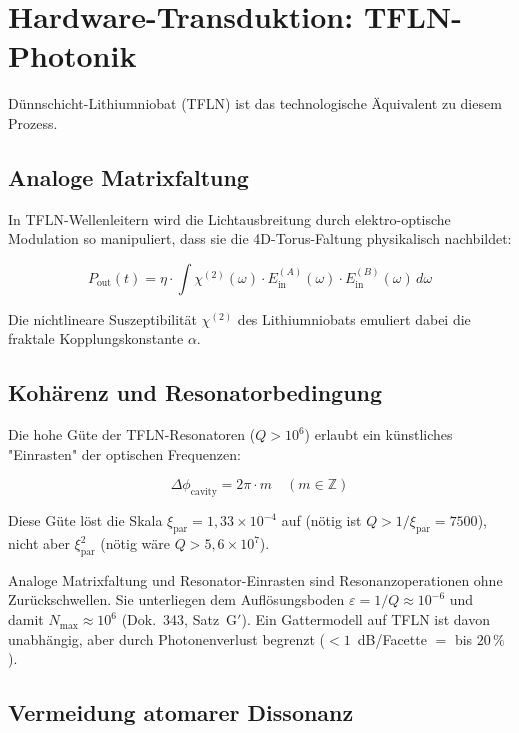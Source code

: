 	\section{Hardware-Transduktion: TFLN-Photonik}
	
	Dünnschicht-Lithiumniobat (TFLN) ist das technologische Äquivalent zu diesem Prozess.
	
	\subsection{Analoge Matrixfaltung}
	
	In TFLN-Wellenleitern wird die Lichtausbreitung durch elektro-optische Modulation so manipuliert, dass sie die 4D-Torus-Faltung physikalisch nachbildet:
	
	\begin{equation}
		P_{\text{out}}(t) = \eta \cdot \int \chi^{(2)}(\omega) \cdot E_{\text{in}}^{(A)}(\omega) \cdot E_{\text{in}}^{(B)}(\omega) \, d\omega
	\end{equation}
	
	Die nichtlineare Suszeptibilität $\chi^{(2)}$ des Lithiumniobats emuliert dabei die fraktale Kopplungskonstante $\alpha$.
	
	\subsection{Kohärenz und Resonatorbedingung}
	
	Die hohe Güte der TFLN-Resonatoren ($Q > 10^6$) erlaubt ein künstliches "Einrasten" der optischen Frequenzen:
	
	\begin{equation}
		\Delta \phi_{\text{cavity}} = 2\pi \cdot m \quad (m \in \mathbb{Z})
	\end{equation}
	
	Diese Güte löst die Skala $\xi_{\text{par}} = 1{,}33\times10^{-4}$ auf (nötig ist $Q > 1/\xi_{\text{par}} = 7500$), nicht aber $\xi_{\text{par}}^2$ (nötig wäre $Q > 5{,}6\times10^{7}$).
	
	Analoge Matrixfaltung und Resonator-Einrasten sind Resonanzoperationen ohne Zurückschwellen. Sie unterliegen dem Auflösungsboden $\varepsilon = 1/Q \approx 10^{-6}$ und damit $N_\mathrm{max} \approx 10^{6}$ (Dok.~343, Satz~G$'$). Ein Gattermodell auf TFLN ist davon unabhängig, aber durch Photonenverlust begrenzt ($<1$~dB/Facette $=$ bis $20\,\%$).
	
	\subsection{Vermeidung atomarer Dissonanz}
	
